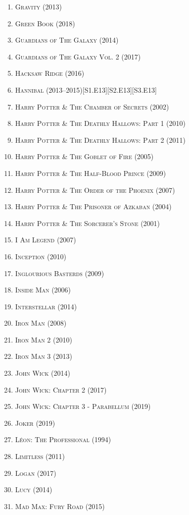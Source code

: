 \documentclass{article}
\begin{document}
\begin{enumerate}
	\item \textsc{Gravity} (2013)
	\item \textsc{Green Book} (2018)
	\item \textsc{Guardians of The Galaxy} (2014)
	\item \textsc{Guardians of The Galaxy Vol. 2} (2017)
	\item \textsc{Hacksaw Ridge} (2016)
	\item \textsc{Hannibal} (2013--2015)\hfill[S1.E13][S2.E13][S3.E13]
	\item \textsc{Harry Potter \& The Chamber of Secrets} (2002)
	\item \textsc{Harry Potter \& The Deathly Hallows: Part 1} (2010)
	\item \textsc{Harry Potter \& The Deathly Hallows: Part 2} (2011)
	\item \textsc{Harry Potter \& The Goblet of Fire} (2005)
	\item \textsc{Harry Potter \& The Half-Blood Prince} (2009)
	\item \textsc{Harry Potter \& The Order of the Phoenix} (2007)
	\item \textsc{Harry Potter \& The Prisoner of Azkaban} (2004)
	\item \textsc{Harry Potter \& The Sorcerer's Stone} (2001)
	\item \textsc{I Am Legend} (2007)
	\item \textsc{Inception} (2010)
	\item \textsc{Inglourious Basterds} (2009)
	\item \textsc{Inside Man} (2006)
	\item \textsc{Interstellar} (2014)
	\item \textsc{Iron Man} (2008)
	\item \textsc{Iron Man 2} (2010)
	\item \textsc{Iron Man 3} (2013)
	\item \textsc{John Wick} (2014)
	\item \textsc{John Wick: Chapter 2} (2017)
	\item \textsc{John Wick: Chapter 3 - Parabellum} (2019)
	\item \textsc{Joker} (2019)
	\item \textsc{L\'eon: The Professional} (1994)
	\item \textsc{Limitless} (2011)
	\item \textsc{Logan} (2017)
	\item \textsc{Lucy} (2014)
	\item \textsc{Mad Max: Fury Road} (2015)

\end{enumerate}
\end{document}
